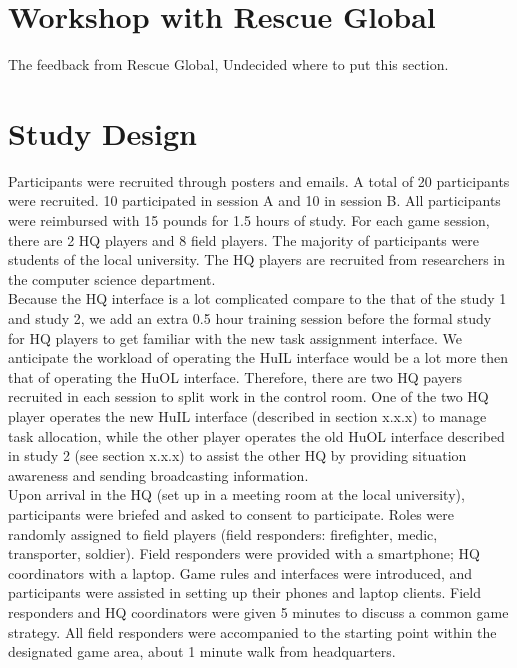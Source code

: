 \section{Workshop with Rescue Global}
The feedback from Rescue Global, Undecided where to put this section. 

\section{Study Design}
Participants were recruited through posters and emails. A total of 20 participants were recruited. 10 participated in session A and 10 in session B. All participants were reimbursed with 15 pounds for 1.5 hours of study. For each game session, there are 2 HQ players and 8 field players. The majority of participants were students of the local university. The HQ players are recruited from researchers in the computer science department. \\

Because the HQ interface is a lot complicated compare to the that of the study 1 and study 2, we add an extra 0.5 hour training session before the formal study for HQ players to get familiar with the new task assignment interface. We anticipate the workload of operating the HuIL interface would be a lot more then that of operating the HuOL interface. Therefore, there are two HQ payers recruited in each session to split work in the control room. One of the two HQ player operates the new HuIL interface (described in section x.x.x) to manage task allocation, while the other player operates the old HuOL interface described in study 2 (see section x.x.x) to assist the other HQ by providing situation awareness and sending broadcasting information. \\

Upon arrival in the HQ (set up in a meeting room at the local university), participants were briefed and asked to consent to participate. Roles were randomly assigned to field players (field responders: firefighter, medic, transporter, soldier). Field responders were provided with a smartphone; HQ coordinators with a laptop. Game rules and interfaces were introduced, and participants were assisted in setting up their phones and laptop clients. Field responders and HQ coordinators were given 5 minutes to discuss a common game strategy. All field responders were accompanied to the starting point within the designated game area, about 1 minute walk from headquarters.\\

